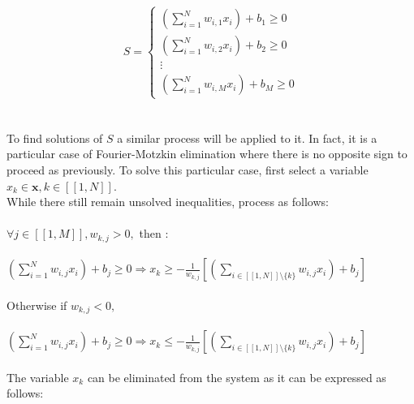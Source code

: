 \documentclass{article}
\begin{document}
\begin{appendices}
    \begin{equation*}
        S=
        \begin{cases}
             (\sum_{i=1}^{N} w_{i,1}x_{i}) + b_{1} \geqslant 0
            \\  (\sum_{i=1}^{N} w_{i,2}x_{i}) + b_{2} \geqslant 0
            \\ \vdots 
            \\  (\sum_{i=1}^{N} w_{i,M}x_{i}) + b_{M} \geqslant 0
        \end{cases}
        \end{equation*}
        \
        \\\\
        To find solutions of $S$ a similar process will be applied to it. In fact, it is a particular case of Fourier-Motzkin elimination where there is 
        no opposite sign to proceed as previously. To solve this particular case, first select a variable $x_{k} \in \textbf{x},k \in [\![1,N]\!]$.\\
        While there still remain unsolved inequalities, process as follows:\\\\
        $\forall j \in [\![1,M]\!],{w_{k,j}}>0,$ then :
        \\\\
        $(\sum_{i=1}^{N} w_{i,j}x_{i}) + b_{j} \geqslant 0 \Rightarrow 
        x_{k} \geqslant - \frac{1}{w_{k,j}}[(\sum_{i \in [\![1,N]\!] \setminus \lbrace{k}\rbrace}  w_{i,j}x_{i}) + b_{j}]
        $ 
        \\\\
        Otherwise if ${w_{k,j}}<0,$
        \\\\
        $(\sum_{i=1}^{N} w_{i,j}x_{i}) + b_{j} \geqslant 0 \Rightarrow 
        x_{k} \leqslant - \frac{1}{w_{k,j}}[(\sum_{i \in [\![1,N]\!] \setminus \lbrace{k}\rbrace}  w_{i,j}x_{i}) + b_{j}]
        $ 
        \\\\
        The variable $x_{k}$ can be eliminated from the system as it can be expressed as follows:
        

\end{appendices}
\end{document}

